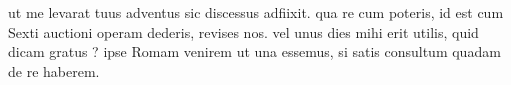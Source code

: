 


 ut me levarat tuus adventus sic discessus adfiixit. qua re cum poteris, id est cum Sexti auctioni operam dederis, revises nos. vel unus dies mihi erit utilis, quid dicam gratus ? ipse Romam venirem ut una essemus, si satis consultum quadam de re haberem.
